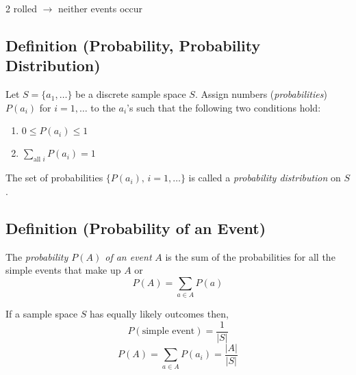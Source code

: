 2 rolled $ \rightarrow $ neither events occur

\begin{defbox}
    \subsection{Definition (Probability, Probability Distribution)}
    Let $ S=\{a_1,\ldots\} $ be a discrete sample space $ S $. Assign
    numbers (\emph{probabilities}) $ P(a_i) $ for $ i=1,\ldots $ to the $ a_i $'s
    such that the following two conditions hold:
    \begin{enumerate}[(1)]
        \item $ 0\le P(a_i)\le 1 $
        \item $\sum\limits_{\text{all } i}P(a_i)=1 $
    \end{enumerate}
    The set of probabilities $ \{P(a_i),\,i=1,\ldots \} $ is called
    a \emph{probability distribution} on $ S $.
\end{defbox}

\begin{defbox}
    \subsection{Definition (Probability of an Event)}
    The \emph{probability $ P(A) $ of an event} $ A $ is the sum of the
    probabilities for all the simple events that make up $ A $ or
    \[ P(A)=\sum\limits_{a\in A}P(a) \]
\end{defbox}

If a sample space $ S $ has equally likely outcomes then,
\[ P(\text{simple event})=\frac{1}{|S|} \]
\[ P(A)=\sum\limits_{a\in A} P(a_i)=\frac{|A|}{|S|} \]
